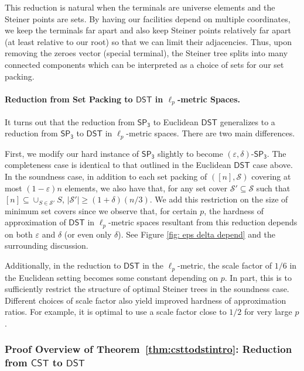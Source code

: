 \documentclass{article}\providecommand{\DeclareRedundantLanguages}[2]{}\usepackage[a4paper,margin=20mm]{geometry}
\newcommand{\1}{\textbf{1}}
\newcommand{\cst}{$\mathsf{CST}$\xspace}
\newcommand{\setpT}{$\mathsf{SP_3}$\xspace}
\newcommand{\dst}{$\mathsf{DST}$\xspace}
\begin{document}
This reduction is natural when the terminals are universe elements and the Steiner points are sets. By having our facilities depend on multiple coordinates, we keep the terminals far apart and also keep Steiner points relatively far apart (at least relative to our root) so that we can limit their adjacencies. Thus, upon removing the zeroes vector (special terminal), the Steiner tree splits into many connected components which can be interpreted as a choice of sets for our set packing.

\paragraph{Reduction from Set Packing to \texorpdfstring{\dst}{DST} in \texorpdfstring{$\ell_p$}{lp}-metric Spaces.}
It turns out that the reduction from \setpT to Euclidean \dst generalizes  to a reduction from \setpT to \dst in $\ell_p$-metric spaces. There are two main differences. 

First, we modify our hard instance of \setpT slightly to become $(\varepsilon, \delta)$-\setpT. The completeness case is identical to that outlined in the Euclidean \dst case above. In the soundness case, in addition to each set packing of $([n], \mathcal{S})$ covering at most $(1-\varepsilon)n$ elements, we also have that, for any set cover $\mathcal{S}' \subseteq \mathcal{S}$ such that $[n] \subseteq \cup_{S \in \mathcal{S}'} S$, $|\mathcal{S}'| \geq (1 + \delta)(n/3)$. We add this restriction on the size of minimum set covers since we observe that, for certain $p$, the hardness of approximation of \dst in $\ell_p$-metric spaces resultant from this reduction depends on both $\varepsilon$ and $\delta$ (or even only $\delta$). See Figure \ref{fig: eps delta depend} and the surrounding discussion.

Additionally, in the reduction to \dst in the $\ell_p$-metric, the scale factor of $1/6$ in the Euclidean setting becomes some constant depending on $p$. In part, this is to sufficiently restrict the structure of optimal Steiner trees in the soundness case. Different choices of scale factor also yield improved hardness of approximation ratios. For example, it is optimal to use a scale factor close to $1/2$ for very large $p$.





\subsubsection{Proof Overview of Theorem~\ref{thm:csttodstintro}:  Reduction from \texorpdfstring{\cst}{CST} to \texorpdfstring{\dst}{DST}}
\end{document}
